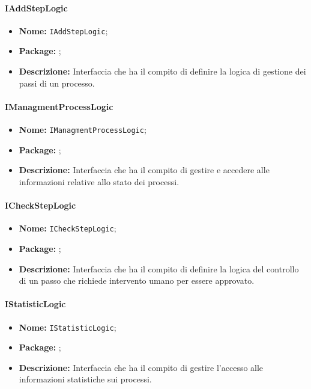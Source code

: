 \paragraph{IAddStepLogic}
\begin{itemize}
\item \textbf{Nome:} \texttt{IAddStepLogic};
\item \textbf{Package:} \texttt{\iLogicAdmin{}};
\item \textbf{Descrizione:} Interfaccia che ha il compito di definire la logica di gestione dei passi di un processo.
\end{itemize}


\paragraph{IManagmentProcessLogic}

\begin{itemize}
\item \textbf{Nome:} \texttt{IManagmentProcessLogic};
\item \textbf{Package:} \texttt{\iLogicAdmin{}};
\item \textbf{Descrizione:} Interfaccia che ha il compito di gestire e accedere alle informazioni relative allo stato dei processi.
\end{itemize}


\paragraph{ICheckStepLogic}
\begin{itemize}
\item \textbf{Nome:} \texttt{ICheckStepLogic};
\item \textbf{Package:} \texttt{\iLogicAdmin{}};
\item \textbf{Descrizione:} Interfaccia che ha il compito di definire la logica del controllo di un passo che richiede intervento umano per essere approvato.
\end{itemize}


\paragraph{IStatisticLogic}
\begin{itemize}
\item \textbf{Nome:} \texttt{IStatisticLogic};
\item \textbf{Package:} \texttt{\iLogicAdmin{}};
\item \textbf{Descrizione:} Interfaccia che ha il compito di gestire l'accesso alle informazioni statistiche sui processi.
\end{itemize}


